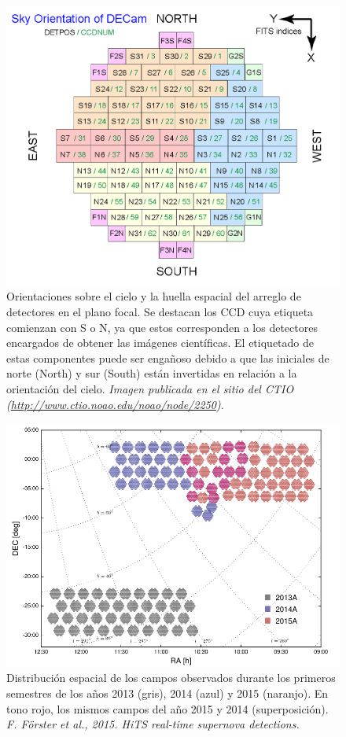 \begin{figure}[h!]
\centering
\includegraphics[scale=.75]{images/decam}
\caption{Orientaciones sobre el cielo y la huella espacial del arreglo de detectores en el plano focal. Se destacan los CCD cuya etiqueta comienzan con S o N, ya que estos corresponden a los detectores encargados de obtener las im\'agenes cient\'ificas. El etiquetado de estas componentes puede ser enga\~noso debido a que las iniciales de norte (North) y sur (South) est\'an invertidas en relaci\'on a la orientaci\'on del cielo. \textit{Imagen publicada en el sitio del CTIO (\url{http://www.ctio.noao.edu/noao/node/2250})}.}
\label{fig:f4}
\end{figure}

\begin{figure}
\centering
\includegraphics[scale=.5]{images/fields}
\caption{Distribuci\'on espacial de los campos observados durante los primeros semestres de los a\~nos 2013 (gris), 2014 (azul) y 2015 (naranjo). En tono rojo, los mismos campos del a\~no 2015 y 2014 (superposici\'on). \textit{F. F\"orster et al., 2015. HiTS real-time supernova detections.}}
\end{figure}

